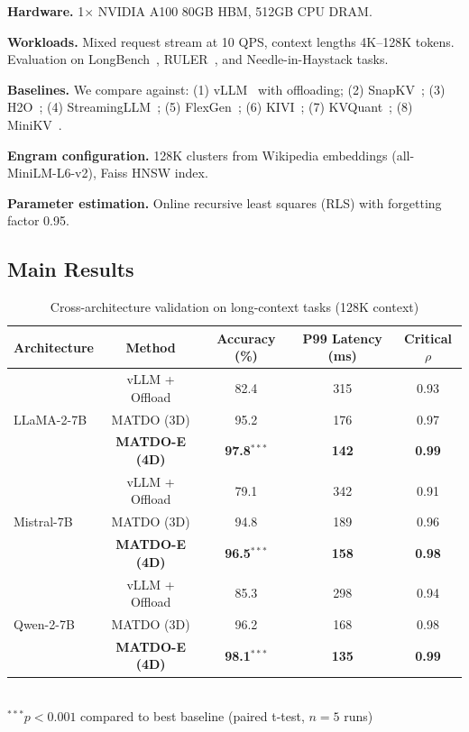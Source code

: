 \documentclass[11pt,a4paper]{article}
\theoremstyle{plain}
\theoremstyle{definition}
\begin{document}
\textbf{Hardware.} 1$\times$ NVIDIA A100 80GB HBM, 512GB CPU DRAM.

\textbf{Workloads.} Mixed request stream at 10 QPS, context lengths 4K--128K tokens. Evaluation on LongBench~\cite{bai2023longbench}, RULER~\cite{hsieh2024ruler}, and Needle-in-Haystack tasks.

\textbf{Baselines.} We compare against: (1) vLLM~\cite{kwon2023} with offloading; (2) SnapKV~\cite{li2024snapkv}; (3) H2O~\cite{zhang2023h2o}; (4) StreamingLLM~\cite{xiao2024streamingllm}; (5) FlexGen~\cite{sheng2023}; (6) KIVI~\cite{liu2024kivi}; (7) KVQuant~\cite{hooper2024kvquant}; (8) MiniKV~\cite{sharma2025minikv}.

\textbf{Engram configuration.} 128K clusters from Wikipedia embeddings (all-MiniLM-L6-v2), Faiss HNSW index.

\textbf{Parameter estimation.} Online recursive least squares (RLS) with forgetting factor 0.95.

\subsection{Main Results}

\begin{table}[h]
\centering
\caption{Cross-architecture validation on long-context tasks (128K context)}
\label{tab:cross}
\begin{tabular}{@{}lcccc@{}}
\toprule
Architecture & Method & Accuracy (\%) & P99 Latency (ms) & Critical $\rho$ \\
\midrule
\multirow{3}{*}{LLaMA-2-7B}   
& vLLM + Offload & 82.4 & 315 & 0.93 \\
& MATDO (3D)      & 95.2 & 176 & 0.97 \\
& \textbf{MATDO-E (4D)} & \textbf{97.8$^{***}$} & \textbf{142} & \textbf{0.99} \\
\midrule
\multirow{3}{*}{Mistral-7B}   
& vLLM + Offload & 79.1 & 342 & 0.91 \\
& MATDO (3D) & 94.8 & 189 & 0.96 \\
& \textbf{MATDO-E (4D)} & \textbf{96.5$^{***}$} & \textbf{158} & \textbf{0.98} \\
\midrule
\multirow{3}{*}{Qwen-2-7B}    
& vLLM + Offload & 85.3 & 298 & 0.94 \\
& MATDO (3D) & 96.2 & 168 & 0.98 \\
& \textbf{MATDO-E (4D)} & \textbf{98.1$^{***}$} & \textbf{135} & \textbf{0.99} \\
\bottomrule
\end{tabular}
\\[3pt]
\footnotesize{$^{***}p < 0.001$ compared to best baseline (paired t-test, $n=5$ runs)}
\end{table}
\end{document}
